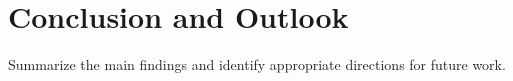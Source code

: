 \section{Conclusion and Outlook}
\label{sec:conclusion-outlook}

Summarize the main findings and identify appropriate directions for future work.
